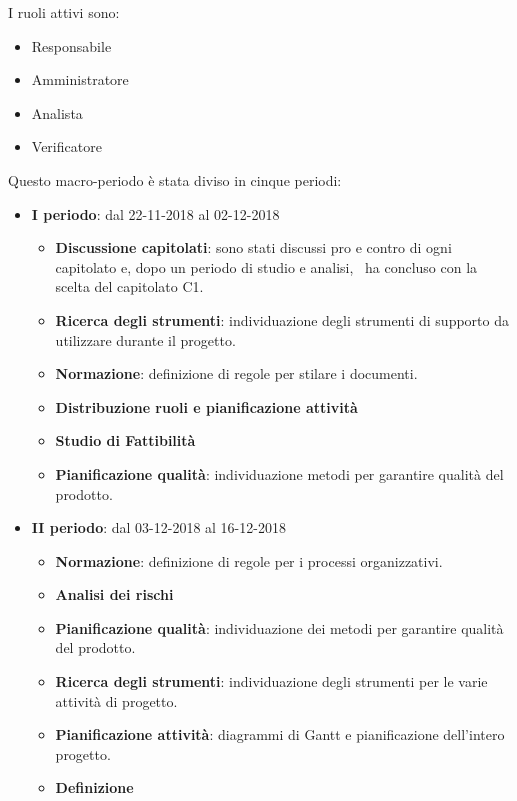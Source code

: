         I ruoli attivi sono:
        \begin{itemize}
            \item Responsabile
            \item Amministratore
            \item Analista
            \item Verificatore
        \end{itemize}
        Questo macro-periodo è stata diviso in cinque periodi:
		\begin{itemize}
			\item \textbf{I periodo}: dal 22-11-2018 al 02-12-2018
			\begin{itemize}
    	        \item \textbf{Discussione capitolati}: sono stati discussi pro e contro di ogni capitolato e, dopo un periodo di
				studio e analisi, \gruppo\ ha concluso con la scelta del capitolato C1.
    	        \item \textbf{Ricerca degli strumenti}: individuazione degli strumenti di supporto da utilizzare durante il progetto.
    	        \item \textbf{Normazione}: definizione di regole per stilare i documenti.
    	        \item \textbf{Distribuzione ruoli e pianificazione attività}
       	        \item \textbf{Studio di Fattibilità}
       	        \item \textbf{Pianificazione qualità}: individuazione metodi per garantire qualità del prodotto.
			\end{itemize}
			\newpage
			\item \textbf{II periodo}: dal 03-12-2018 al 16-12-2018
			\begin{itemize}
    	        \item \textbf{Normazione}: definizione di regole per i processi organizzativi.
    	        \item \textbf{Analisi dei rischi}
    	        \item \textbf{Pianificazione qualità}: individuazione dei metodi per garantire qualità del prodotto.
       	        \item \textbf{Ricerca degli strumenti}: individuazione degli strumenti per le varie attività di progetto.
       	        \item \textbf{Pianificazione attività}: diagrammi di Gantt e pianificazione dell'intero progetto.
       	        \item \textbf{Definizione }

\end{itemize}
\end{itemize}
